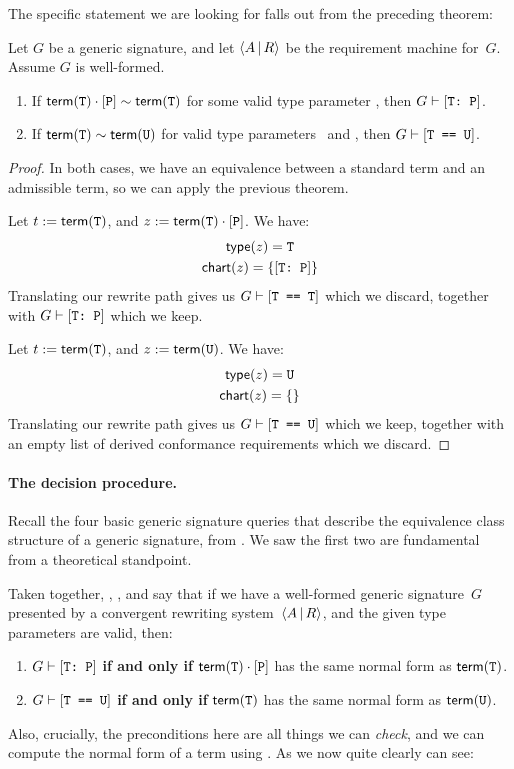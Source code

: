 \documentclass[../generics]{subfiles}
\begin{document}
The specific statement we are looking for falls out from the preceding theorem:

\begin{corollary}\label{path to derivation swift}
Let $G$ be a generic signature, and let $\langle A\,|\,R\rangle$ be the requirement machine for~$G$. Assume $G$ is well-formed.
\begin{enumerate}
\item If $\mathsf{term}(\texttt{T})\cdot[\texttt{P}] \sim \mathsf{term}(\texttt{T})$ for some valid type parameter \tT, then $G \vdash [\texttt{T:~P}]$.
\item If $\mathsf{term}(\texttt{T}) \sim \mathsf{term}(\texttt{U})$ for valid type parameters \tT\ and \tU, then $G\vdash[\texttt{T == U}]$.
\end{enumerate}
\end{corollary}
\begin{proof}
In both cases, we have an equivalence between a standard term and an admissible term, so we can apply the previous theorem.

 Let $t := \mathsf{term}(\texttt{T})$, and $z := \mathsf{term}(\texttt{T})\cdot[\texttt{P}]$. We have:
\begin{gather*}
\mathsf{type}(z)=\texttt{T}\\
\mathsf{chart}(z) = \{[\texttt{T:~P}]\}
\end{gather*}
Translating our rewrite path gives us $G\vdash[\texttt{T == T}]$ which we discard, together with $G\vdash[\texttt{T:~P}]$ which we keep.

 Let $t := \mathsf{term}(\texttt{T})$, and $z := \mathsf{term}(\texttt{U})$. We have:
\begin{gather*}
\mathsf{type}(z) = \texttt{U}\\
\mathsf{chart}(z)=\{\}
\end{gather*}
Translating our rewrite path gives us $G\vdash[\texttt{T == U}]$ which we keep, together with an empty list of derived conformance requirements which we discard.
\end{proof}

\paragraph{The decision procedure.} Recall the four basic generic signature queries that describe the equivalence class structure of a generic signature, from . We saw the first two are fundamental from a theoretical standpoint.

Taken together, , , and  say that if we have a well-formed generic signature~$G$ presented by a convergent rewriting system~$\langle A\,|\,R\rangle$, and the given type parameters are valid, then:
\begin{enumerate}
\item $G\vdash[\texttt{T:~P}]$ \textbf{if and only if} $\mathsf{term}(\texttt{T})\cdot[\texttt{P}]$ has the same normal form as $\mathsf{term}(\texttt{T})$.
\item $G\vdash[\texttt{T == U}]$ \textbf{if and only if} $\mathsf{term}(\texttt{T})$ has the same normal form as $\mathsf{term}(\texttt{U})$.
\end{enumerate}
Also, crucially, the preconditions here are all things we can \emph{check}, and we can compute the normal form of a term using . As we now quite clearly can see:
\end{document}
